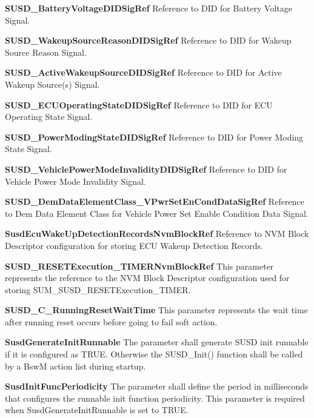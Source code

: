{\textbf{SUSD\_BatteryVoltageDIDSigRef }\newline
Reference to DID for Battery Voltage Signal.

\textbf{SUSD\_WakeupSourceReasonDIDSigRef}\newline
Reference to DID for Wakeup Source Reason Signal.

\textbf{SUSD\_ActiveWakeupSourceDIDSigRef}\newline
Reference to DID for Active Wakeup Source(s) Signal.

\textbf{SUSD\_ECUOperatingStateDIDSigRef}\newline
Reference to DID for ECU Operating State Signal.

\textbf{SUSD\_PowerModingStateDIDSigRef}\newline
Reference to DID for Power Moding State Signal.

\textbf{SUSD\_VehiclePowerModeInvalidityDIDSigRef}\newline
Reference to DID for Vehicle Power Mode Invalidity Signal.

\textbf{SUSD\_DemDataElementClass\_VPwrSetEnCondDataSigRef}\newline
Reference to Dem Data Element Class for Vehicle Power Set Enable Condition Data Signal.

\textbf{SusdEcuWakeUpDetectionRecordsNvmBlockRef}\newline
Reference to NVM Block Descriptor configuration for storing ECU Wakeup Detection Records.

\textbf{SUSD\_RESETExecution\_TIMERNvmBlockRef}\newline
This parameter represents the reference to the NVM Block Descriptor configuration used for storing SUM\_SUSD\_RESETExecution\_TIMER.

\textbf{SUSD\_C\_RunningResetWaitTime}\newline
This parameter represents the wait time after running reset occurs before going to fail soft action.

\textbf{SusdGenerateInitRunnable}\newline
The parameter shall generate SUSD init runnable if it is configured as TRUE. Otherwise the SUSD\_Init() function shall be called by a BswM action list during startup.

\textbf{SusdInitFuncPeriodicity}\newline
The parameter shall define the period in milliseconds that configures the runnable init function periodicity. This parameter is required when SusdGenerateInitRunnable is set to TRUE.

}
